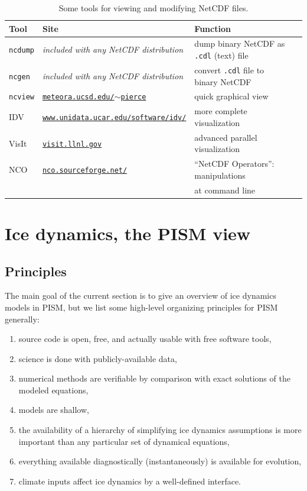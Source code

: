\documentclass[11pt,final]{amsart}
\renewcommand{\t}[1]{\texttt{#1}}
\begin{document}
\begin{table}[ht]
\caption{Some tools for viewing and modifying NetCDF files.}\label{tab:NetCDFview} 
\small
\begin{tabular}{@{}llll}\hline
\textbf{Tool} & \textbf{Site} & \textbf{Function}\\ \hline
\verb|ncdump| & \emph{included with any NetCDF distribution} & dump binary NetCDF as \texttt{.cdl} (text) file \\
\verb|ncgen| & \emph{included with any NetCDF distribution} & convert \texttt{.cdl} file to binary NetCDF \\
\verb|ncview|\index{ncview} & \href{http://meteora.ucsd.edu/~pierce/ncview_home_page.html}{\texttt{meteora.ucsd.edu/$\sim$pierce}} & quick graphical view \\
IDV & \href{http://www.unidata.ucar.edu/software/idv/}{\t{www.unidata.ucar.edu/software/idv/}} & more complete visualization \\
VisIt & \href{http://visit.llnl.gov}{\t{visit.llnl.gov}} & advanced parallel visualization \\
NCO\index{NCO (NetCDF Operators)} & \href{http://nco.sourceforge.net/}{\t{nco.sourceforge.net/}} & ``NetCDF Operators'': manipulations \\
\quad  & & \quad at command line
\end{tabular}
\normalsize
\end{table}



\clearpage
\newpage
\section{Ice dynamics, the PISM view}\label{sect:dynamics}

\subsection{Principles}  The main goal of the current section is to give an overview of ice dynamics models in PISM, but we list some high-level organizing principles for PISM generally:
\begin{enumerate}
\item source code is open, free, and actually usable with free software tools,
\item science is done with publicly-available data,
\item numerical methods are verifiable by comparison with exact solutions of the modeled equations,
\item models are shallow,
\item the availability of a hierarchy of simplifying ice dynamics assumptions is more important than any particular set of dynamical equations,
\item everything available diagnostically (instantaneously) is available for evolution,
\item climate inputs affect ice dynamics by a well-defined interface.
\end{enumerate}
\end{document}

